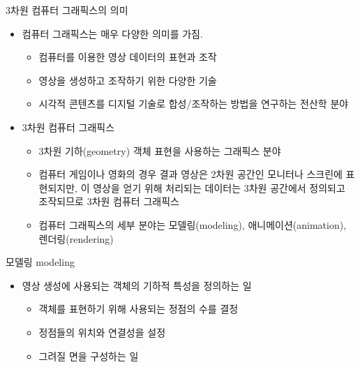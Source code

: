 \documentclass{beamer}
\begin{document}
\begin{frame}{3차원 컴퓨터 그래픽스의 의미}

\begin{itemize}
\item 컴퓨터 그래픽스는 매우 다양한 의미를 가짐.
	\begin{itemize}
	\item 컴퓨터를 이용한 영상 데이터의 표현과 조작
	\item 영상을 생성하고 조작하기 위한 다양한 기술
	\item 시각적 콘텐츠를 디지털 기술로 합성/조작하는 방법을 연구하는 전산학 분야
	\end{itemize}
\end{itemize}

\begin{itemize}
\item 3차원 컴퓨터 그래픽스
	\begin{itemize}
	\item 3차원 기하(geometry) 객체 표현을 사용하는 그래픽스 분야
	\item 컴퓨터 게임이나 영화의 경우 결과 영상은 2차원 공간인 모니터나 스크린에 표현되지만, 이 영상을 얻기 위해 처리되는 데이터는 3차원 공간에서 정의되고 조작되므로 3차원 컴퓨터 그래픽스
	\item 컴퓨터 그래픽스의 세부 분야는 모델링(modeling), 애니메이션(animation), 렌더링(rendering)
	\end{itemize}
\end{itemize}

\end{frame}



\begin{frame}{모델링 modeling}

\begin{itemize}
\item 영상 생성에 사용되는 객체의 기하적 특성을 정의하는 일
	\begin{itemize}
	\item 객체를 표현하기 위해 사용되는 정점의 수를 결정
	\item 정점들의 위치와 연결성을 설정
	\item 그려질 면을 구성하는 일
	\end{itemize}
\end{itemize}
\end{frame}
\end{document}
